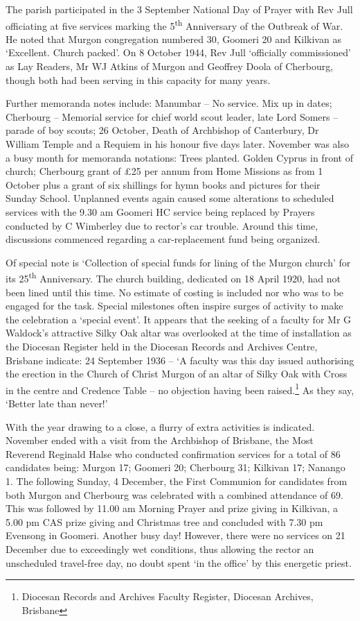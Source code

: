 The parish participated in the 3 September National Day of Prayer with Rev Jull officiating at five services marking the 5\textsuperscript{th} Anniversary of the Outbreak of War. He noted that Murgon congregation numbered 30, Goomeri 20 and Kilkivan as `Excellent. Church packed'. On 8 October 1944, Rev Jull `officially commissioned' as Lay Readers, Mr WJ Atkins of Murgon and Geoffrey Doola of Cherbourg, though both had been serving in this capacity for many years.

Further memoranda notes include: Manumbar -- No service. Mix up in dates; Cherbourg -- Memorial service for chief world scout leader, late Lord Somers -- parade of boy scouts; 26 October, Death of Archbishop of Canterbury, Dr William Temple and a Requiem in his honour five days later. November was also a busy month for memoranda notations: Trees planted. Golden Cyprus in front of church; Cherbourg grant of £25 per annum from Home Missions as from 1 October plus a grant of six shillings for hymn books and pictures for their Sunday School. Unplanned events again caused some alterations to scheduled services with the 9.30 am Goomeri HC service being replaced by Prayers conducted by C Wimberley due to rector's car trouble. Around this time, discussions commenced regarding a car-replacement fund being organized.

Of special note is `Collection of special funds for lining of the Murgon church' for its 25\textsuperscript{th} Anniversary. The church building, dedicated on 18 April 1920, had not been lined until this time. No estimate of costing is included nor who was to be engaged for the task. Special milestones often inspire surges of activity to make the celebration a `special event'. It appears that the seeking of a faculty for Mr G Waldock's attractive Silky Oak altar was overlooked at the time of installation as the Diocesan Register held in the Diocesan Records and Archives Centre, Brisbane indicate: 24 September 1936 -- `A faculty was this day issued authorising the erection in the Church of Christ Murgon of an altar of Silky Oak with Cross in the centre and Credence Table -- no objection having been raised.\footnote{Diocesan Records and Archives Faculty Register, Diocesan Archives, Brisbane} As they say, `Better late than never!'

With the year drawing to a close, a flurry of extra activities is indicated. November ended with a visit from the Archbishop of Brisbane, the Most Reverend Reginald Halse who conducted confirmation services for a total of 86 candidates being: Murgon 17; Goomeri 20; Cherbourg 31; Kilkivan 17; Nanango 1. The following Sunday, 4 December, the First Communion for candidates from both Murgon and Cherbourg was celebrated with a combined attendance of 69. This was followed by 11.00 am Morning Prayer and prize giving in Kilkivan, a 5.00 pm CAS prize giving and Christmas tree and concluded with 7.30 pm Evensong in Goomeri. Another busy day! However, there were no services on 21 December due to exceedingly wet conditions, thus allowing the rector an unscheduled travel-free day, no doubt spent `in the office' by this energetic priest.

